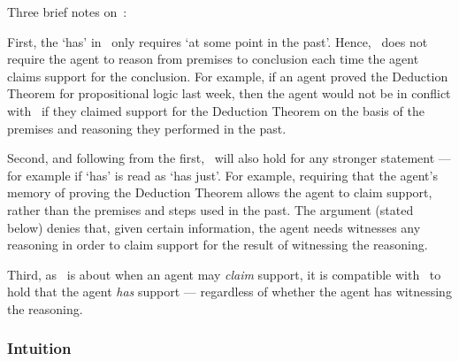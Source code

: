 \begin{note}
  Three brief notes on~\ESU{}:
\end{note}

\begin{note}
  First, the `has' in~\ESU{} only requires `at some point in the past'.
  Hence,~\ESU{} does not require the agent to reason from premises to conclusion each time the agent claims support for the conclusion.
  For example, if an agent proved the Deduction Theorem for propositional logic last week, then the agent would not be in conflict with~\ESU{} if they claimed support for the Deduction Theorem on the basis of the premises and reasoning they performed in the past.
\end{note}

\begin{note}
  Second, and following from the first,~\ESU{} will also hold for any stronger statement --- for example if `has' is read as `has just'.
  For example, requiring that the agent's memory of proving the Deduction Theorem allows the agent to claim support, rather than the premises and steps used in the past.
  The argument (stated below) denies that, given certain information, the agent needs witnesses any reasoning in order to claim support for the result of witnessing the reasoning.
\end{note}

\begin{note}
  Third, as~\ESU{} is about when an agent may \emph{claim} support, it is compatible with~\ESU{} to hold that the agent \emph{has} support --- regardless of whether the agent has witnessing the reasoning.
\end{note}



\subsubsection{Intuition}

